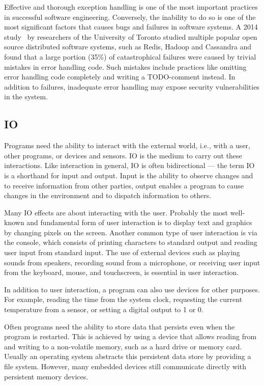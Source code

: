Effective and thorough exception handling is one of the most important practices in successful software engineering. Conversely, the inability to do so is one of the most significant factors that causes bugs and failures in software systems. A 2014 study~\cite{simple-testing-failures} by researchers of the University of Toronto studied multiple popular open source distributed software systems, such as Redis, Hadoop and Cassandra and found that a large portion (35\%) of catastrophical failures were caused by trivial mistakes in error handling code. Such mistakes include practices like omitting error handling code completely and writing a TODO-comment instead. In addition to failures, inadequate error handling may expose security vulnerabilities in the system.


\subsection{IO}
Programs need the ability to interact with the external world, i.e., with a user, other programs, or devices and sensors. IO is the medium to carry out these interactions. Like interaction in general, IO is often bidirectional --- the term IO is a shorthand for input and output. Input is the ability to observe changes and to receive information from other parties, output enables a program to cause changes in the environment and to dispatch information to others.

Many IO effects are about interacting with the user. Probably the most well-known and fundamental form of user interaction is to display text and graphics by changing pixels on the screen. Another common type of user interaction is via the console, which consists of printing characters to standard output and reading user input from standard input. The use of external devices such as playing sounds from speakers, recording sound from a microphone, or receiving user input from the keyboard, mouse, and touchscreen, is essential in user interaction.

In addition to user interaction, a program can also use devices for other purposes. For example, reading the time from the system clock, requesting the current temperature from a sensor, or setting a digital output to 1 or 0.

Often programs need the ability to store data that persists even when the program is restarted. This is achieved by using a device that allows reading from and writing to a non-volatile memory, such as a hard drive or memory card. Usually an operating system abstracts this persistent data store by providing a file system. However, many embedded devices still communicate directly with persistent memory devices.

